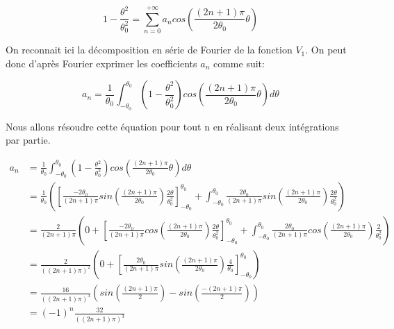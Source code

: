 \documentclass{article}
\begin{document}
\begin{equation}
    1 - \frac{\theta^2}{\theta_0^2}
    = \sum_{n=0}^{+\infty} a_n
    cos\left(\frac{(2n+1)\pi}{2\theta_0}\theta\right)
\end{equation}

On reconnait ici la décomposition en série de Fourier
de la fonction $V_1$. On peut donc d'après Fourier exprimer
les coefficients $a_n$ comme suit:

\begin{equation}
    a_n = \frac{1}{\theta_0}
    \int_{-\theta_0}^{\theta_0}
    \left(1 - \frac{\theta^2}{\theta_0^2}\right)
    cos\left(\frac{(2n+1)\pi}{2\theta_0}\theta\right) d\theta
\end{equation}

Nous allons résoudre cette équation pour tout n en réalisant
deux intégrations par partie.

\begin{align*}
    a_n & = \frac{1}{\theta_0}
        \int_{-\theta_0}^{\theta_0}
        \left(1 - \frac{\theta^2}{\theta_0^2}\right)
        cos\left(\frac{(2n+1)\pi}{2\theta_0}\theta\right)
        d\theta \\
        & = \frac{1}{\theta_0}
        \left(
            \left[ \frac{-2\theta_0}{(2n+1)\pi}
             sin\left(\frac{(2n+1)\pi}{2\theta_0}\right)
             \frac{2\theta}{\theta_0^2} \right]_{-\theta_0}^{\theta_0}
             + \int_{-\theta_0}^{\theta_0}
             \frac{2\theta_0}{(2n+1)\pi}
             sin\left(\frac{(2n+1)\pi}{2\theta_0}\right)
             \frac{2\theta}{\theta_0^2}
         \right) \\
        & = \frac{2}{(2n+1)\pi}
        \left( 0 +
            \left[ \frac{-2\theta_0}{(2n+1)\pi}
             cos\left(\frac{(2n+1)\pi}{2\theta_0}\right)
             \frac{2\theta}{\theta_0^2} \right]_{-\theta_0}^{\theta_0}
             + \int_{-\theta_0}^{\theta_0}
             \frac{2\theta_0}{(2n+1)\pi}
             cos\left(\frac{(2n+1)\pi}{2\theta_0}\right)
             \frac{2}{\theta_0^2}
         \right) \\
        & = \frac{2}{\left((2n+1)\pi\right)^2} 
        \left(0 +
            \left[\frac{2\theta_0}{(2n+1)\pi}
            sin\left(\frac{(2n+1)\pi}{2\theta_0}\right)
            \frac{4}{\theta_0}
             \right]_{-\theta_0}^{\theta_0}
         \right) \\
        & = \frac{16}{\left((2n+1)\pi\right)^3}
        \left(
            sin\left(\frac{(2n+1)\pi}{2}\right)
            - sin\left(\frac{-(2n+1)\pi}{2}\right)
        \right) \\
        & = \left(-1\right)^n \frac{32}{
            \left((2n+1)\pi\right)^3}
\end{align*}
\end{document}
